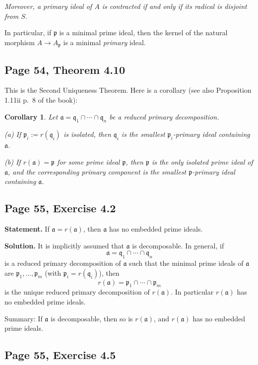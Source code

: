 \documentclass[parskip=half,fontsize=12pt]{scrartcl}%
\newcommand{\mf}{\mathfrak}
\newcommand{\aaa}{\mf a}
\newcommand{\ppp}{\mf p}
\newcommand{\qqq}{\mf q}
\newtheorem{cor}[thm]{Corollary}
\begin{document}
\emph{Moreover, a primary ideal of $A$ is contracted if and only if its radical is disjoint from $S$.}

In particular, if $\ppp$ is a minimal prime ideal, then the kernel of the natural morphism $A\to A_\ppp$ is a minimal \emph{primary} ideal.


\subsection{Page 54, Theorem 4.10}%

This is the Second Uniqueness Theorem. Here is a corollary (see also Proposition 1.11ii p.~8 of the book):

\begin{cor}\label{410}
Let $\aaa=\qqq_1\cap\cdots\cap\qqq_n$ be a reduced primary decomposition.

\emph{(a)} If $\ppp_i:=r(\qqq_i)$ is isolated, then $\qqq_i$ is the smallest $\ppp_i$-primary ideal containing $\aaa$.

\emph{(b)} If $r(\aaa)=\ppp$ for some prime ideal $\ppp$, then $\ppp$ is the only isolated prime ideal of $\aaa$, and the corresponding primary component is the smallest $\ppp$-primary ideal containing $\aaa$.
\end{cor}

\subsection{Page 55, Exercise 4.2}%

\textbf{Statement.} If $\aaa=r(\aaa)$, then $\aaa$ has no embedded prime ideals.

\textbf{Solution.} It is implicitly assumed that $\aaa$ is decomposable. In general, if 
$$
\aaa=\qqq_1\cap\cdots\cap\qqq_n
$$ 
is a reduced primary decomposition of $\aaa$ such that the minimal prime ideals of $\aaa$ are $\ppp_1,\dots,\ppp_m$ (with $\ppp_i=r(\qqq_i)$), then 
$$
r(\aaa)=\ppp_1\cap\cdots\cap\ppp_m
$$ 
is the unique reduced primary decomposition of $r(\aaa)$. In particular $r(\aaa)$ has no embedded prime ideals. 

Summary: If $\aaa$ is decomposable, then so is $r(\aaa)$, and $r(\aaa)$ has no embedded prime ideals. 

\subsection{Page 55, Exercise 4.5}%
\end{document}
